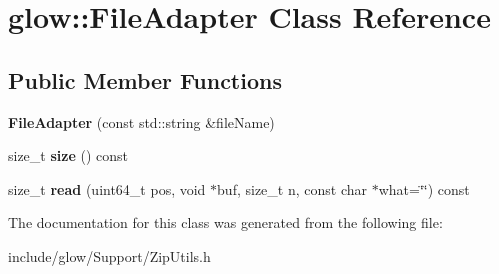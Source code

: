 \hypertarget{classglow_1_1_file_adapter}{}\section{glow\+:\+:File\+Adapter Class Reference}
\label{classglow_1_1_file_adapter}
\subsection*{Public Member Functions}
\begin{DoxyCompactItemize}
\item 
\mbox{\label{classglow_1_1_file_adapter_a4702330cdec451164c119646517043a0}} 
{\bfseries File\+Adapter} (const std\+::string \&file\+Name)
\item 
\mbox{\label{classglow_1_1_file_adapter_ab8970a56039c7bb7dbf8cbae607de0bc}} 
size\+\_\+t {\bfseries size} () const
\item 
\mbox{\label{classglow_1_1_file_adapter_a201f4b26f2357d93383f58bd98ec1975}} 
size\+\_\+t {\bfseries read} (uint64\+\_\+t pos, void $\ast$buf, size\+\_\+t n, const char $\ast$what=\char`\"{}\char`\"{}) const
\end{DoxyCompactItemize}


The documentation for this class was generated from the following file\+:\begin{DoxyCompactItemize}
\item 
include/glow/\+Support/Zip\+Utils.\+h\end{DoxyCompactItemize}
